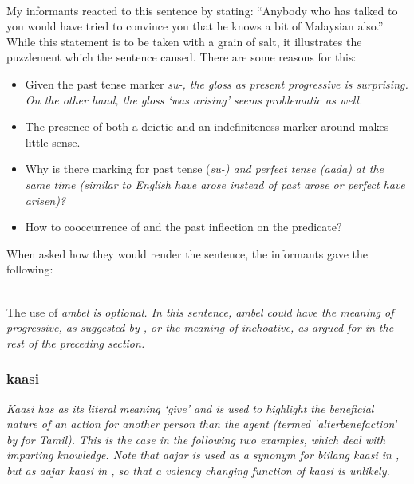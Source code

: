  \\
My informants reacted to this sentence by stating: ``Anybody who has talked to you would have tried to convince you that he knows a bit of Malaysian also.'' While this statement is to be taken with a grain of salt, it illustrates the  puzzlement which the sentence caused. There are some reasons for this:
\begin{itemize}
 \item Given the past tense marker \em su-\em, the gloss as present progressive is surprising. On the other hand, the gloss `was arising' seems problematic as well.
 \item The presence of both a deictic and an indefiniteness marker around  makes little sense.
 \item Why is there marking for past tense (\em su-\em) and perfect tense (\em aada\em) at the same time (similar to English \em have arose \em instead of past \em arose \em or  perfect \em have arisen\em)?
 \item How to cooccurrence of  and the past inflection on the predicate?
\end{itemize}

When asked how they would render the sentence, the informants gave the following:

 \\
The use of \em ambel \em is optional. In this sentence, \em ambel \em could have the meaning of progressive, as suggested by \citet{SmithEtAl2007}, or the meaning of inchoative, as argued for in the rest of the preceding section.


\subsubsection{kaasi}\label{sec:wc:kaasi}
\em Kaasi \em has as its literal meaning  `give' and is used to highlight the beneficial nature of an action for another person than the agent (termed `alterbenefaction' by \citet[227]{Lehmann1989} for Tamil). This is the case in the following two examples, which deal with imparting knowledge. Note that \em aajar \em is used as a synonym for \em biilang kaasi \em in , but as \em aajar kaasi \em in , so that a valency changing function of \em kaasi \em is unlikely.

